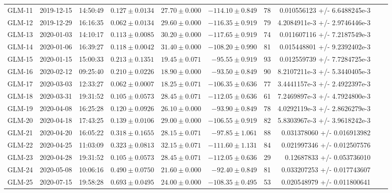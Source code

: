 \begin{table}
\begin{tabular}{rrrrrrrrrr}
GLM-11 & 2019-12-15 & 14:50:49 & $0.127\pm 0.0134$ & $27.70 \pm 0.000$ & $-114.10 \pm  0.849$ & 78           & 0.010556123 +/- 6.6488245e-3  \\
GLM-12 & 2019-12-29 & 16:16:35 & $0.062\pm 0.0134$ & $29.60 \pm 0.000$ & $-116.35 \pm  0.919$ & 79           & 4.2084911e-3 +/- 2.9746446e-3 \\
GLM-13 & 2020-01-03 & 14:10:17 & $0.113\pm 0.0085$ & $30.20 \pm 0.000$ & $-117.65 \pm  0.919$ & 74           & 0.011607116 +/- 7.2187549e-3  \\
GLM-14 & 2020-01-06 & 16:39:27 & $0.118\pm 0.0042$ & $31.40 \pm 0.000$ & $-108.20 \pm  0.990$ & 81           & 0.015448801 +/- 9.2392402e-3  \\
GLM-15 & 2020-01-15 & 15:00:33 & $0.213\pm 0.1351$ & $19.45 \pm 0.071$ & $-95.55 \pm   0.919$ & 93           & 0.012559739 +/- 7.7284725e-3  \\
GLM-16 & 2020-02-12 & 09:25:40 & $0.210\pm 0.0226$ & $18.90 \pm 0.000$ & $-93.50 \pm   0.849$ & 90           & 8.2107211e-3 +/- 5.3440405e-3 \\
GLM-17 & 2020-03-03 & 12:33:27 & $0.062\pm 0.0007$ & $18.25 \pm 0.071$ & $-106.35 \pm  0.636$ & 77           & 3.4441157e-3 +/- 2.4922397e-3 \\
GLM-18 & 2020-03-31 & 19:31:52 & $0.105\pm 0.0573$ & $28.45 \pm 0.071$ & $-112.05 \pm  0.636$ & 61           & 7.2469897e-3 +/- 4.7924800e-3 \\
GLM-19 & 2020-04-08 & 16:25:28 & $0.120\pm 0.0926$ & $26.10 \pm 0.000$ & $-93.90 \pm   0.849$ & 78           & 4.0292119e-3 +/- 2.8626279e-3 \\
GLM-20 & 2020-04-18 & 17:43:25 & $0.139\pm 0.0106$ & $29.00 \pm 0.000$ & $-106.55 \pm  0.919$ & 82           & 5.8303967e-3 +/- 3.9618242e-3 \\
GLM-21 & 2020-04-20 & 16:05:22 & $0.318\pm 0.1655$ & $28.15 \pm 0.071$ & $-97.85 \pm   1.061$ & 88           & 0.031378060 +/- 0.016913982   \\
GLM-22 & 2020-04-25 & 11:03:09 & $0.323\pm 0.0813$ & $32.15 \pm 0.071$ & $-111.60 \pm  1.131$ & 84           & 0.021997346 +/- 0.012507576   \\
GLM-23 & 2020-04-28 & 19:31:52 & $0.105\pm 0.0573$ & $28.45 \pm 0.071$ & $-112.05 \pm  0.636$ & 29           & 0.12687833 +/- 0.053736010    \\
GLM-24 & 2020-05-08 & 10:06:16 & $0.490\pm 0.0750$ & $21.60 \pm 0.000$ & $-92.40 \pm   0.849$ & 81           & 0.033207253 +/- 0.017743607   \\
GLM-25 & 2020-07-15 & 19:58:28 & $0.693\pm 0.0495$ & $24.00 \pm 0.000$ & $-108.35 \pm  0.495$ & 53           & 0.020548979 +/- 0.011800641   \\

\end{tabular}
\end{table}
